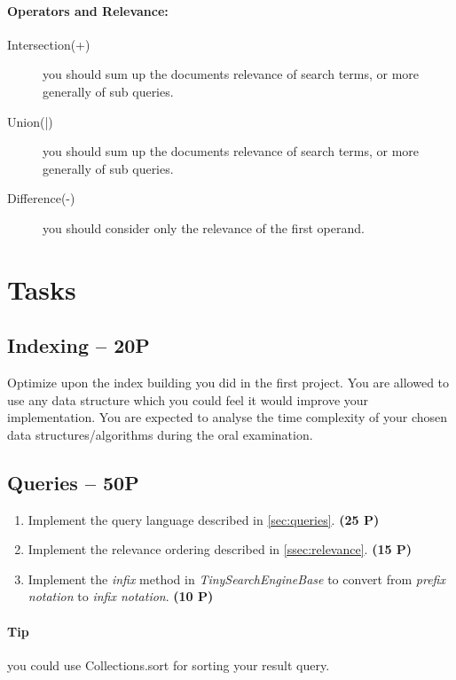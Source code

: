 \documentclass[11pt]{article}
\begin{document}
\paragraph{Operators and Relevance:}
\begin{description}
\item[Intersection(+)] you should sum up the documents relevance of search terms, or more generally of sub queries.
\item[Union(|)] you should sum up the documents relevance of search terms, or more generally of sub queries.
\item[Difference(-)] you should consider only the relevance of the first operand.
\end{description}

\section{Tasks}

\subsection{Indexing -- 20P} 
\label{ssec:indexing}
Optimize upon the index building you did in the first project. You are allowed to use any data structure which you could feel it would improve your implementation. You are expected to analyse the time complexity of your chosen data structures/algorithms during the oral examination.\\

\subsection{Queries -- 50P} 
\begin{enumerate}
\item Implement the query language described in \ref{sec:queries}. \textbf{(25 P)}
\item Implement the relevance ordering described  in \ref{ssec:relevance}. \textbf{(15 P)}
\item Implement the \textit{infix} method  in \textit{TinySearchEngineBase} to convert from \textit{prefix notation} to \textit{infix notation}. \textbf{(10 P)}
\end{enumerate}

\paragraph{Tip} you could use Collections.sort for sorting your result query.
\end{document}
